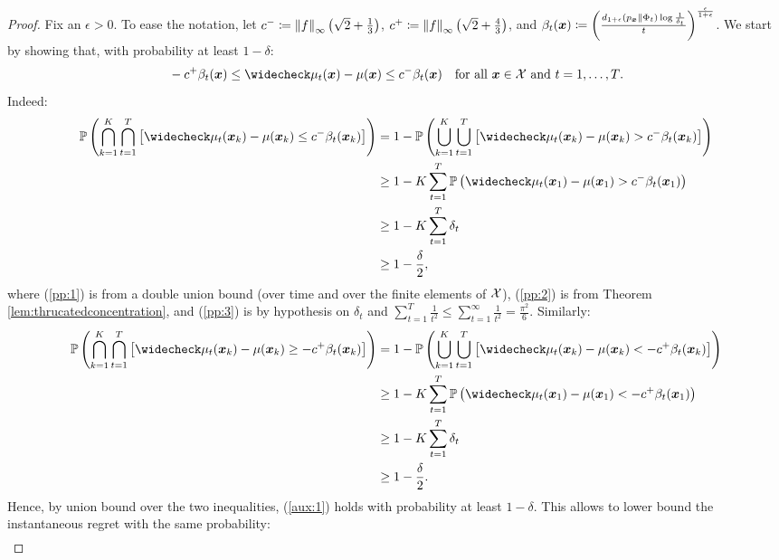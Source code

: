 \regretdiscrete*
%
\begin{proof}
	Fix an $\epsilon>0$.
	To ease the notation, let $c^{-}\coloneqq \norm[\infty]{f}\left(\sqrt{2}+\frac{1}{3}\right)$, $c^{+}\coloneqq \norm[\infty]{f}\left(\sqrt{2}+\frac{4}{3}\right)$, and $\beta_t(\vx) \coloneqq \left(\frac{d_{1+\epsilon}(p_{\vx}\|\Phi_t)\log\frac{1}{\delta_t}}{t}\right)^{\frac{\epsilon}{1+\epsilon}}$.
	We start by showing that, with probability at least $1-\delta$:
	\begin{align}\label{aux:1}
		&-c^{+}\beta_t({\vx})\leq \wc{\mu_t}(\vx) - \mu(\vx) \leq c^{-}\beta_t(\vx) & \text{for all $\vx\in\Xspace$ and $t=1,\dots,T$}.
	\end{align}
	Indeed:
	\begin{align}
		\Prob\left(\bigcap_{k=1}^{K}\bigcap_{t=1}^T\left[\wc{\mu_t}(\vx_k) - \mu(\vx_k) \leq c^{-}\beta_t(\vx_k)\right]\right) &=1-\Prob\left(\bigcup_{k=1}^{K}\bigcup_{t=1}^T\left[\wc{\mu_t}(\vx_k) - \mu(\vx_k) > c^{-}\beta_t(\vx_k)\right]\right)\nonumber\\
		&\geq 1-K\sum_{t=1}^{T}\Prob\left(\wc{\mu_t}(\vx_1) - \mu(\vx_1) > c^{-}\beta_t(\vx_1)\right) \label{pp:1}\\
		& \geq 1 - K\sum_{t=1}^{T}\delta_t\label{pp:2}\\
		& \geq 1 - \frac{\delta}{2},\label{pp:3}
	\end{align}
	where (\ref{pp:1}) is from a double union bound (over time and over the finite elements of $\Xspace$), (\ref{pp:2}) is from Theorem \ref{lem:thrucatedconcentration}, and (\ref{pp:3}) is by hypothesis on $\delta_t$ and $\sum_{t=1}^{T}\frac{1}{t^2}\leq\sum_{t=1}^{\infty}\frac{1}{t^2} = \frac{\pi^2}{6}$. Similarly:
	\begin{align*}
		\Prob\left(\bigcap_{k=1}^{K}\bigcap_{t=1}^T\left[\wc{\mu_t}(\vx_k) - \mu(\vx_k) \geq -c^{+}\beta_t(\vx_k)\right]\right) &=1-\Prob\left(\bigcup_{k=1}^{K}\bigcup_{t=1}^T\left[\wc{\mu_t}(\vx_k) - \mu(\vx_k) < -c^{+}\beta_t(\vx_k)\right]\right)\nonumber\\
		&\geq 1-K\sum_{t=1}^{T}\Prob\left(\wc{\mu_t}(\vx_1) - \mu(\vx_1) < -c^{+}\beta_t(\vx_1)\right)\\
		&\geq 1 - K\sum_{t=1}^{T}\delta_t\\
		 &\geq 1 - \frac{\delta}{2}.
	\end{align*}
	Hence, by union bound over the two inequalities, (\ref{aux:1}) holds with probability at least $1-\delta$.
	This allows to lower bound the instantaneous regret with the same probability:
	\begin{align}

\end{align}
\end{proof}
